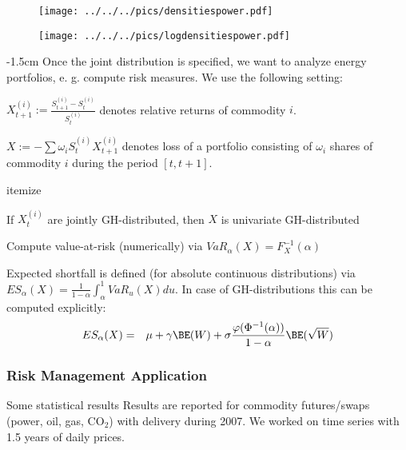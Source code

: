 {} %
\begin{center}
\begin{figure}
\texttt{[image: ../../../pics/densitiespower.pdf]}
\end{figure}
\end{center}

{} %
\begin{center}
\begin{figure}
\texttt{[image: ../../../pics/logdensitiespower.pdf]}
\end{figure}
\end{center}

{-1.5cm}
Once the joint distribution is specified, we want to analyze
energy portfolios, e. g. compute risk measures. We use the
following setting:
\item $X_{t+1}^{(i)}:=\frac{S_{t+1}^{(i)}-S_t^{(i)}}{S_t^{(i)}}$
denotes relative returns of commodity $i$. \item
$X:=-\sum\omega_iS_t^{(i)}X_{t+1}^{(i)}$ denotes loss of a
portfolio consisting of $\omega_i$ shares of commodity $i$ during
the period $[t,t+1]$.

{itemize}
\item If $X_t^{(i)}$ are jointly GH-distributed, then $X$ is
univariate GH-distributed \item Compute value-at-risk
(numerically) via $ VaR_{\alpha}(X)=F^{-1}_X(\alpha) $ \item
Expected shortfall is defined (for absolute continuous
distributions) via $ ES_{\alpha}(X)
=\frac{1}{1-\alpha}\int_{\alpha}^1VaR_u(X)du$. In case of
GH-distributions this can be computed explicitly:
\begin{eqnarray*}
ES_{\alpha}(X)&=&\mu+\gamma\BE(W)+\sigma\frac{\varphi(\Phi^{-1}(\alpha))}{1-\alpha}\BE(\sqrt{W})
\end{eqnarray*}

\subsubsection{Risk Management Application}

{Some statistical results} %
Results are reported for commodity futures/swaps (power, oil, gas,
CO$_2$) with delivery during 2007. We worked on time series with
1.5 years of daily prices.

